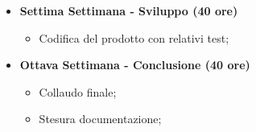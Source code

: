 {\begin{itemize}
        \begin{itemize}
            \item Codifica del prodotto con relativi test;
        \end{itemize}
        \item \textbf{Settima Settimana - Sviluppo (40 ore)}
        \begin{itemize}
            \item Codifica del prodotto con relativi test;
        \end{itemize}
        \item \textbf{Ottava Settimana - Conclusione (40 ore)}
        \begin{itemize}
            \item Collaudo finale;
            \item Stesura documentazione;
        \end{itemize}
    \end{itemize}
}

\newcommand{\totaleOre}{}

\newcommand{\obiettiviObbligatori}{
	 \item \underline{\textit{O01}}: Creazione del frontend per la rappresentazione dello schema societario;
	 \item \underline{\textit{O02}}: Interazione con i dati da backend via API REST sullo schema societario;
}

\newcommand{\obiettiviDesiderabili}{
	 \item \underline{\textit{D01}}: Richiamare e rappresentare notizie riguardanti gli esponenti e le società collegate alla società analizzata, usando altri servizi API di Riskapp per la ricerca di notizie;
}

\newcommand{\obiettiviFacoltativi}{
	 \item \underline{\textit{F01}}: Test a livello di frontend;
}
